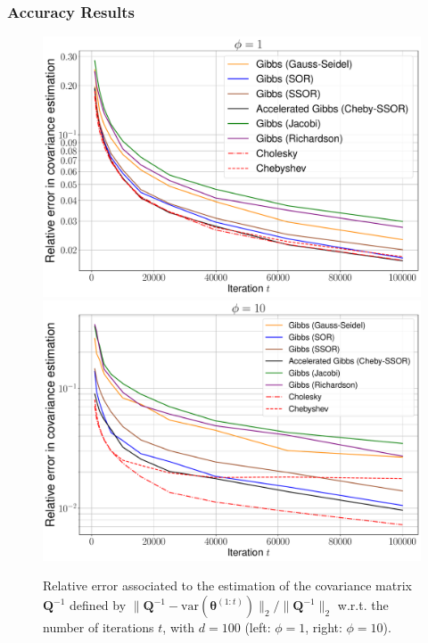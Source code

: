 \documentclass[aspectratio=169]{beamer}
\newcommand{\B}[1]{\mathbf{#1}} %
\begin{document}
\begin{frame}
  \frametitle{Accuracy Results}
  \begin{figure}
    \mbox{{\includegraphics[scale=0.19]{src/images/simus2_ex1_convGibbs_phi_1_bis.pdf}}}
    \mbox{{\includegraphics[scale=0.19]{src/images/simus2_ex1_convGibbs_phi_10_bis.pdf}}}
    \caption{Relative error associated to the estimation of the covariance matrix $\B{Q}^{-1}$ defined by $\|\B{Q}^{-1} - \text{var}(\boldsymbol{\theta}^{(1:t)})\|_2/\|\B{Q}^{-1}\|_2$  w.r.t. the number of iterations $t$, with $d=100$ (left: $\phi=1$, right: $\phi=10$). }
  \end{figure}
\end{frame}
\end{document}
